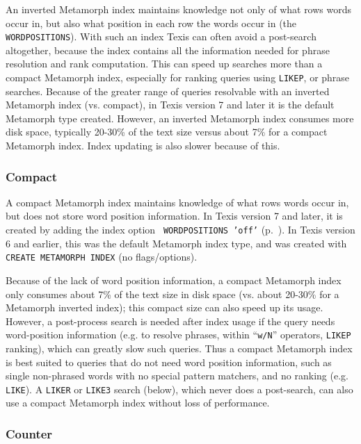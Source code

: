   An inverted Metamorph index maintains knowledge not only of what
rows words occur in, but also what position in each row the words
occur in (the \verb`WORDPOSITIONS`).  With such an index Texis can
often avoid a post-search altogether, because the index contains all
the information needed for phrase resolution and rank computation.
This can speed up searches more than a compact Metamorph index,
especially for ranking queries using \verb`LIKEP`, or phrase searches.
Because of the greater range of queries resolvable with an inverted
Metamorph index (vs. compact), in Texis version 7 and later it is the
default Metamorph type created.  However, an inverted Metamorph index
consumes more disk space, typically 20-30\% of the text size versus
about 7\% for a compact Metamorph index.  Index updating is also
slower because of this.

\subsubsection{Compact}

  A compact Metamorph index maintains knowledge of what rows words
occur in, but does not store word position information.  In Texis
version 7 and later, it is created by adding the index option {\tt
WORDPOSITIONS 'off'} (p.~\pageref{IndexOptions}).  In Texis version 6
and earlier, this was the default Metamorph index type, and was
created with {\tt CREATE METAMORPH INDEX} (no flags/options).

  Because of the lack of word position information, a compact
Metamorph index only consumes about 7\% of the text size in disk space
(vs. about 20-30\% for a Metamorph inverted index); this compact size
can also speed up its usage.  However, a post-process search is needed
after index usage if the query needs word-position information
(e.g. to resolve phrases, within ``\verb`w/N`'' operators,
\verb`LIKEP` ranking), which can greatly slow such queries.  Thus a
compact Metamorph index is best suited to queries that do not need
word position information, such as single non-phrased words with no
special pattern matchers, and no ranking (e.g. \verb`LIKE`).  A
\verb`LIKER` or \verb`LIKE3` search (below), which never does a
post-search, can also use a compact Metamorph index without loss of
performance.

\subsubsection{Counter}

